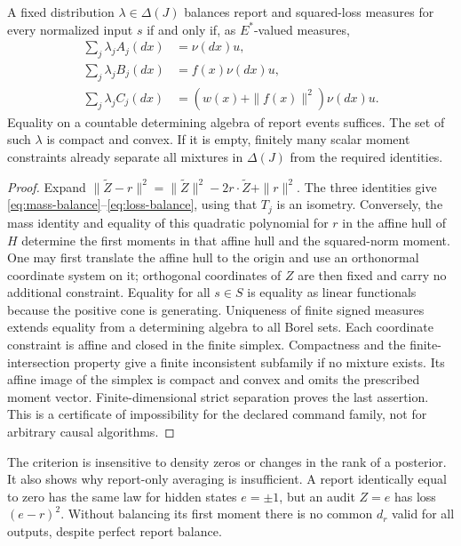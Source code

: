 \begin{proposition}\label{prop:moment}
A fixed distribution $\lambda\in\Delta(J)$ balances report and squared-loss measures for every normalized input $s$ if and only if, as $E^*$-valued measures,
\begin{align}
 \sum_j\lambda_j A_j(dx)&=\nu(dx)u,\label{eq:moment0}\\
 \sum_j\lambda_j B_j(dx)&=f(x)\nu(dx)u,\label{eq:moment1}\\
 \sum_j\lambda_j C_j(dx)&=(w(x)+\|f(x)\|^2)\nu(dx)u.\label{eq:moment2}
\end{align}
Equality on a countable determining algebra of report events suffices. The set of such $\lambda$ is compact and convex. If it is empty, finitely many scalar moment constraints already separate all mixtures in $\Delta(J)$ from the required identities.
\end{proposition}
\begin{proof}
Expand $\|\widetilde Z-r\|^2=\|\widetilde Z\|^2-2r\cdot\widetilde Z+\|r\|^2$. The three identities give \eqref{eq:mass-balance}--\eqref{eq:loss-balance}, using that $T_j$ is an isometry. Conversely, the mass identity and equality of this quadratic polynomial for $r$ in the affine hull of $H$ determine the first moments in that affine hull and the squared-norm moment. One may first translate the affine hull to the origin and use an orthonormal coordinate system on it; orthogonal coordinates of $Z$ are then fixed and carry no additional constraint. Equality for all $s\in S$ is equality as linear functionals because the positive cone is generating. Uniqueness of finite signed measures extends equality from a determining algebra to all Borel sets. Each coordinate constraint is affine and closed in the finite simplex. Compactness and the finite-intersection property give a finite inconsistent subfamily if no mixture exists. Its affine image of the simplex is compact and convex and omits the prescribed moment vector. Finite-dimensional strict separation proves the last assertion. This is a certificate of impossibility for the declared command family, not for arbitrary causal algorithms.
\end{proof}

The criterion is insensitive to density zeros or changes in the rank of a posterior. It also shows why report-only averaging is insufficient. A report identically equal to zero has the same law for hidden states $e=\pm1$, but an audit $Z=e$ has loss $(e-r)^2$. Without balancing its first moment there is no common $d_r$ valid for all outputs, despite perfect report balance.


